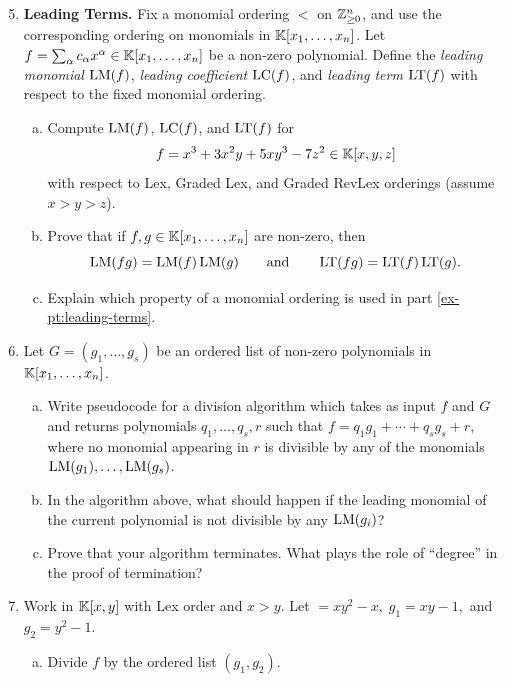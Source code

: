 \documentclass[12pt,reqno]{amsart}
\begin{document}
\begin{enumerate}[leftmargin=*]
\setcounter{enumi}{4}

\item  \textbf{Leading Terms.} Fix a monomial ordering $<$ on $\mathbb{Z}_{\geq 0}^n$, and use the corresponding ordering on monomials in $\mathbb{K}[x_1,\ldots,x_n]$.
 Let $f=\sum_{\alpha} c_\alpha x^\alpha \in \mathbb{K}[x_1,\ldots,x_n]$ be a non-zero polynomial. Define the \emph{leading monomial} $\operatorname{LM}(f)$, \emph{leading coefficient} $\operatorname{LC}(f)$, and \emph{leading term} $\operatorname{LT}(f)$ with respect to the fixed monomial ordering.
\begin{enumerate}[(a)]
    \item Compute $\operatorname{LM}(f)$, $\operatorname{LC}(f)$, and $\operatorname{LT}(f)$ for
    \[
    f=x^3+3x^2y+5xy^3-7z^2 \in \mathbb{K}[x,y,z]
    \]
    with respect to Lex, Graded Lex, and Graded RevLex orderings (assume $x>y>z$).
    
    \item\label{ex-pt:leading-terms} Prove that if $f,g\in \mathbb{K}[x_1,\ldots,x_n]$ are non-zero, then
    \[
    \operatorname{LM}(fg)=\operatorname{LM}(f)\operatorname{LM}(g)
    \qquad\text{and}\qquad
    \operatorname{LT}(fg)=\operatorname{LT}(f)\operatorname{LT}(g).
    \]
    
    \item Explain which property of a monomial ordering is used in part \ref{ex-pt:leading-terms}.
\end{enumerate}

\item Let $G=(g_1,\ldots,g_s)$ be an ordered list of non-zero polynomials in $\mathbb{K}[x_1,\ldots,x_n]$.
\begin{enumerate}[(a)]
    \item Write pseudocode for a division algorithm which takes as input $f$ and $G$ and returns polynomials $q_1,\ldots,q_s,r$ such that $f=q_1g_1+\cdots+q_sg_s+r$, where no monomial appearing in $r$ is divisible by any of the monomials $\operatorname{LM}(g_1),\ldots,\operatorname{LM}(g_s)$.
    
    \item In the algorithm above, what should happen if the leading monomial of the current polynomial is not divisible by any $\operatorname{LM}(g_i)$?
    
    \item Prove that your algorithm terminates. What plays the role of ``degree'' in the proof of termination?
\end{enumerate}

\item\label{ex:need-for-gb} Work in $\mathbb{K}[x,y]$ with Lex order and $x>y$. Let $=xy^2-x, \; g_1=xy-1,$ and $g_2=y^2-1$.
\begin{enumerate}[(a)]
    \item Divide $f$ by the ordered list $(g_1,g_2)$.
    

\end{enumerate}
\end{enumerate}
\end{document}
